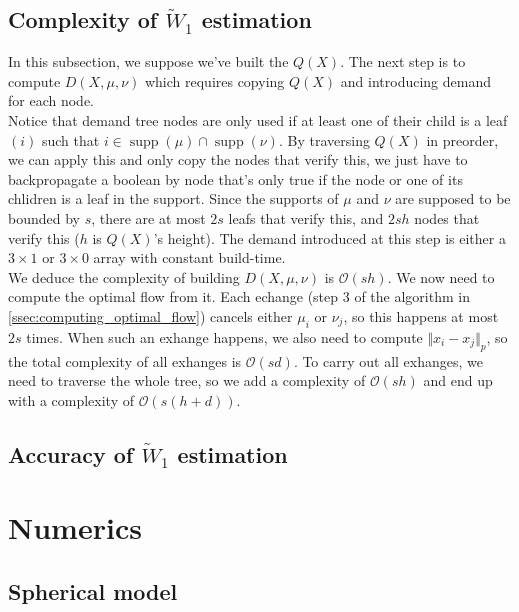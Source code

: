 \documentclass{article}
\DeclareMathOperator\supp{supp}
\begin{document}

\subsection{Complexity of $\widetilde{W}_1$ estimation}
In this subsection, we suppose we've built the $Q(X)$. The next step is to compute $D(X, \mu, \nu)$ which requires copying $Q(X)$ and introducing demand for each node.\\
Notice that demand tree nodes are only used if at least one of their child is a leaf $(i)$ such that $i \in \supp(\mu) \cap \supp(\nu)$. By traversing $Q(X)$ in preorder, we can apply this and only copy the nodes that verify this, we just have to backpropagate a boolean by node that's only true if the node or one of its chlidren is a leaf in the support. Since the supports of $\mu$ and $\nu$ are supposed to be bounded by $s$, there are at most $2s$ leafs that verify this, and $2sh$ nodes that verify this ($h$ is $Q(X)$'s height). The demand introduced at this step is either a $3 \times 1$ or $3 \times 0$ array with constant build-time.\\
We deduce the complexity of building $D(X, \mu, \nu)$ is $\mathcal{O}(sh)$. We now need to compute the optimal flow from it. Each echange (step 3 of the algorithm in \ref{ssec:computing_optimal_flow}) cancels either $\mu_i$ or $\nu_j$, so this happens at most $2s$ times. When such an exhange happens, we also need to compute $\Vert x_i - x_j \Vert_p$, so the total complexity of all exhanges is $\mathcal{O}(sd)$. To carry out all exhanges, we need to traverse the whole tree, so we add a complexity of $\mathcal{O}(sh)$ and end up with a complexity of $\mathcal{O}(s(h+d))$. 

\subsection{Accuracy of $\widetilde{W}_1$ estimation}

\section{Numerics}

\subsection{Spherical model}
\end{document}
